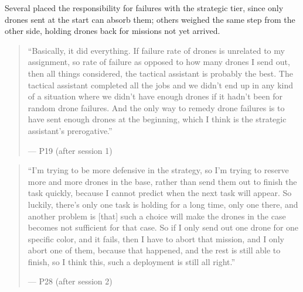 \label{sec:qual:hierarchy:cascade}
Several placed the responsibility for failures with the strategic tier, since only drones sent at the start can absorb them; others weighed the same step from the other side, holding drones back for missions not yet arrived.

\begin{quote}\small
``Basically, it did everything. If failure rate of drones is unrelated to my assignment, so rate of failure as opposed to how many drones I send out, then all things considered, the tactical assistant is probably the best. The tactical assistant completed all the jobs and we didn't end up in any kind of a situation where we didn't have enough drones if it hadn't been for random drone failures. And the only way to remedy drone failures is to have sent enough drones at the beginning, which I think is the strategic assistant's prerogative.''\par\hfill--- P19 (after session 1)
\end{quote}

\begin{quote}\small
``I'm trying to be more defensive in the strategy, so I'm trying to reserve more and more drones in the base, rather than send them out to finish the task quickly, because I cannot predict when the next task will appear. So luckily, there's only one task is holding for a long time, only one there, and another problem is [that] such a choice will make the drones in the case becomes not sufficient for that case. So if I only send out one drone for one specific color, and it fails, then I have to abort that mission, and I only abort one of them, because that happened, and the rest is still able to finish, so I think this, such a deployment is still all right.''\par\hfill--- P28 (after session 2)
\end{quote}

\clearpage
